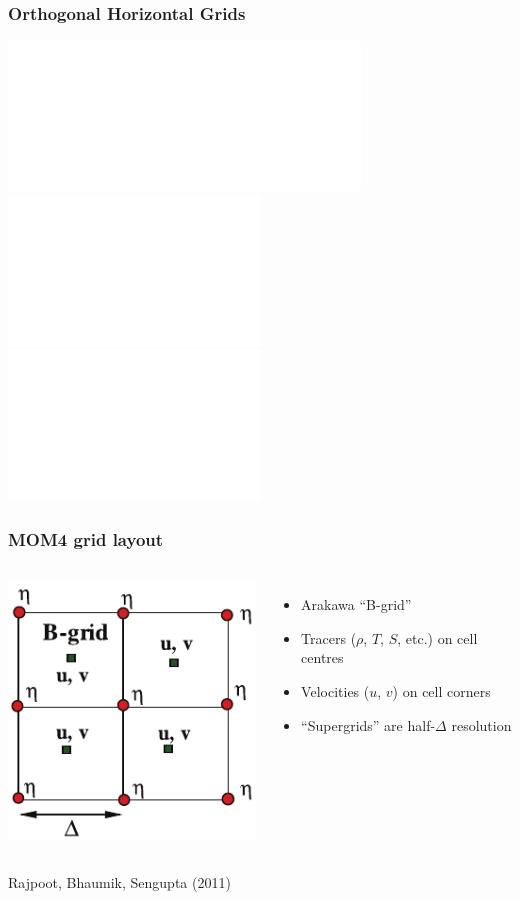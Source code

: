 \documentclass{beamer}
\begin{document}
\begin{frame}
    \frametitle{Orthogonal Horizontal Grids}
    
    \begin{center}
        \includegraphics<1>[width=0.7\textwidth]{merc_tripolar.pdf}
        \includegraphics<2>[width=0.5\textwidth]{nh_tripolar.pdf}
        \includegraphics<2>[width=0.5\textwidth]{sh_tripolar.pdf}
    \end{center}
\end{frame}

\begin{frame}
    \frametitle{MOM4 grid layout}

    \begin{columns}
        \begin{center}
            \includegraphics[width=\textwidth]{b_grid.pdf}
        \end{center}
        \begin{itemize}
            \item Arakawa ``B-grid''
            \item Tracers ($\rho$, $T$, $S$, etc.) on cell centres
            \item Velocities ($u$, $v$) on cell corners
            \item ``Supergrids'' are half-$\Delta$ resolution
        \end{itemize}
    \end{columns}
    {\tiny Rajpoot, Bhaumik, Sengupta (2011)}
\end{frame}
\end{document}
